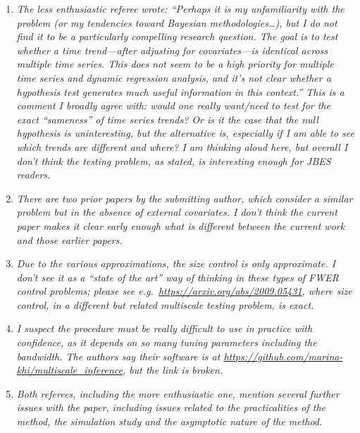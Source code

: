 \documentclass[a4paper,12pt]{article}
\begin{document}
\begin{enumerate}[label=\arabic*.,leftmargin=0.6cm]


\item \textit{The less enthusiastic referee wrote: “Perhaps it is my unfamiliarity with the problem (or my tendencies toward Bayesian methodologies…), but I do not find it to be a particularly compelling research question. The goal is to test whether a time trend—after adjusting for covariates—is identical across multiple time series. This does not seem to be a high priority for multiple time series and dynamic regression analysis, and it’s not clear whether a hypothesis test generates much useful information in this context.” This is a comment I broadly agree with: would one really want/need to test for the exact “sameness” of time series trends? Or is it the case that the null hypothesis is uninteresting, but the alternative is, especially if I am able to see which trends are different and where? I am thinking aloud here, but overall I don’t think the testing problem, as stated, is interesting enough for JBES readers.}


\item \textit{There are two prior papers by the submitting author, which consider a similar problem but in the absence of external covariates. I don’t think the current paper makes it clear early enough what is different between the current work and those earlier papers.}  


\item \textit{Due to the various approximations, the size control is only approximate. I don’t see it as a ``state of the art'' way of thinking in these types of FWER control problems; please see e.g.\ \url{https://arxiv.org/abs/2009.05431},
where size control, in a different but related multiscale testing problem, is exact.}


\item \textit{I suspect the procedure must be really difficult to use in practice with confidence, as it depends on so many tuning parameters including the bandwidth. The authors say their software is at \url{https://github.com/marina-khi/multiscale_inference}, but the link is broken.}


\item \textit{ Both referees, including the more enthusiastic one, mention several further issues with the paper, including issues related to the practicalities of the method, the simulation study and the asymptotic nature of the method.}  

  
\end{enumerate}
\end{document}
